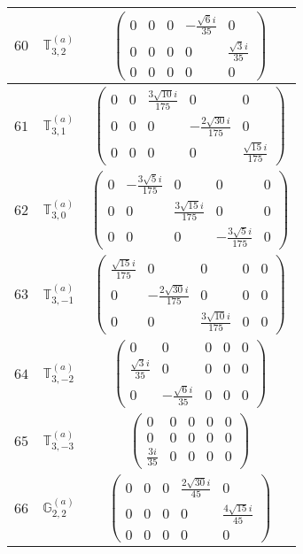 \documentclass[fleqn,8pt,landscape]{jsarticle}
\begin{document}
\begin{center}
\begin{longtable}{ccc}
$ 60 $ & $ \mathbb{T}_{3,2}^{(a)} $ & $ \begin{pmatrix} 0 & 0 & 0 & - \frac{\sqrt{6} i}{35} & 0 \\ 0 & 0 & 0 & 0 & \frac{\sqrt{3} i}{35} \\ 0 & 0 & 0 & 0 & 0 \end{pmatrix} $ \\ \hline
$ 61 $ & $ \mathbb{T}_{3,1}^{(a)} $ & $ \begin{pmatrix} 0 & 0 & \frac{3 \sqrt{10} i}{175} & 0 & 0 \\ 0 & 0 & 0 & - \frac{2 \sqrt{30} i}{175} & 0 \\ 0 & 0 & 0 & 0 & \frac{\sqrt{15} i}{175} \end{pmatrix} $ \\ \hline
$ 62 $ & $ \mathbb{T}_{3,0}^{(a)} $ & $ \begin{pmatrix} 0 & - \frac{3 \sqrt{5} i}{175} & 0 & 0 & 0 \\ 0 & 0 & \frac{3 \sqrt{15} i}{175} & 0 & 0 \\ 0 & 0 & 0 & - \frac{3 \sqrt{5} i}{175} & 0 \end{pmatrix} $ \\ \hline
$ 63 $ & $ \mathbb{T}_{3,-1}^{(a)} $ & $ \begin{pmatrix} \frac{\sqrt{15} i}{175} & 0 & 0 & 0 & 0 \\ 0 & - \frac{2 \sqrt{30} i}{175} & 0 & 0 & 0 \\ 0 & 0 & \frac{3 \sqrt{10} i}{175} & 0 & 0 \end{pmatrix} $ \\ \hline
$ 64 $ & $ \mathbb{T}_{3,-2}^{(a)} $ & $ \begin{pmatrix} 0 & 0 & 0 & 0 & 0 \\ \frac{\sqrt{3} i}{35} & 0 & 0 & 0 & 0 \\ 0 & - \frac{\sqrt{6} i}{35} & 0 & 0 & 0 \end{pmatrix} $ \\ \hline
$ 65 $ & $ \mathbb{T}_{3,-3}^{(a)} $ & $ \begin{pmatrix} 0 & 0 & 0 & 0 & 0 \\ 0 & 0 & 0 & 0 & 0 \\ \frac{3 i}{35} & 0 & 0 & 0 & 0 \end{pmatrix} $ \\ \hline
$ 66 $ & $ \mathbb{G}_{2,2}^{(a)} $ & $ \begin{pmatrix} 0 & 0 & 0 & \frac{2 \sqrt{30} i}{45} & 0 \\ 0 & 0 & 0 & 0 & \frac{4 \sqrt{15} i}{45} \\ 0 & 0 & 0 & 0 & 0 \end{pmatrix} $ \\ \hline

\end{longtable}
\end{center}
\end{document}

